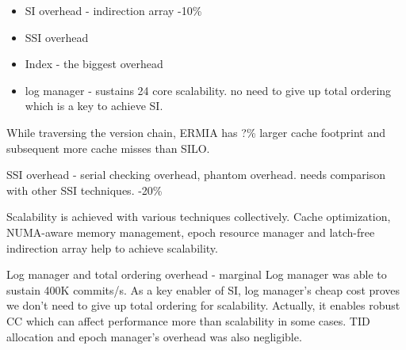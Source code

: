 \begin{itemize}
\item SI overhead - indirection array  -10\%
\item SSI overhead 
\item Index - the biggest overhead
\item log manager - sustains 24 core scalability. no need to give up total ordering which is a key to achieve SI.
\end{itemize}

While traversing the version chain, ERMIA has ?\% larger cache footprint and subsequent more cache misses than SILO. 

SSI overhead - serial checking overhead, phantom overhead. needs comparison with other SSI techniques.  -20\%

Scalability is achieved with various techniques collectively. Cache optimization, NUMA-aware memory management, epoch resource manager and latch-free indirection array help to achieve scalability. 

Log manager and total ordering overhead - marginal
Log manager was able to sustain 400K commits/s. As a key enabler of SI, log manager's cheap cost proves we don't need to give up total ordering for scalability. Actually, it enables robust CC which can affect performance more than scalability in some cases.
TID allocation and epoch manager's overhead was also negligible. 

